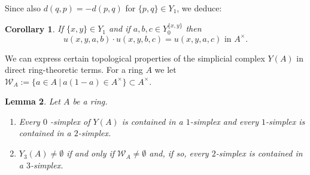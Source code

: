 \documentclass[12pt]{amsart}
\newtheorem{lem}{Lemma}[section]
\newtheorem{cor}[lem]{Corollary}
\theoremstyle{definition}
\newcommand{\wn}[1]{\mathcal{W}_{#1}}%
\newcommand{\<}{\langle}
\renewcommand{\>}{\rangle}
\begin{document}
Since also $d(q,p)=-d(p,q)$ for $\{ p,q\}\in Y_1$, we deduce:
\begin{cor}\label{cor:cr}
If $\{x,y\}\in Y_1$ and if $a,b,c\in Y^{\{ x,y\}}_0$ then 
\[
u(x,y,a,b)\cdot u(x,y,b,c)=u(x,y,a,c)   \mbox{ in }A^\times.
\]
\end{cor}



We can express certain topological properties of the  simplicial complex $Y(A)$ in direct ring-theoretic terms. For a ring $A$ we let $\wn{A}:=\{ a\in A\ |\ a(1-a)\in A^\times\}\subset A^\times$. 
\begin{lem}\label{lem:ya} Let $A$ be a ring.
\begin{enumerate}
\item Every $0$ -simplex of $Y(A)$ is contained in a $1$-simplex and every $1$-simplex is contained in a $2$-simplex.
\item $Y_3(A)\not=\emptyset$ if and only if $\wn{A}\not=\emptyset$ and, if so, every $2$-simplex is contained in a $3$-simplex.
\end{enumerate}
\end{lem}
\end{document}

